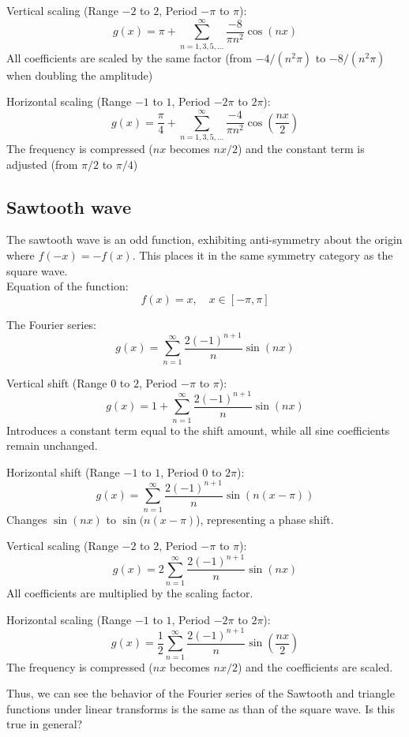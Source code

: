 \documentclass{article}
\begin{document}
Vertical scaling (Range $-2$ to $2$, Period $-\pi$ to $\pi$):
$$g(x) = \pi + \sum_{n=1,3,5,...}^{\infty}\frac{-8}{\pi n^2}\cos(nx)$$
All coefficients are scaled by the same factor (from $-4/(n^2\pi)$ to $-8/(n^2\pi)$ when doubling the amplitude)

Horizontal scaling (Range $-1$ to $1$, Period $-2\pi$ to $2\pi$):
$$g(x) = \frac{\pi}{4} +\sum_{n=1,3,5,...}^{\infty}\frac{-4}{\pi n^2}\cos\left(\frac{nx}{2}\right)$$
The frequency is compressed ($nx$ becomes $nx/2$) and the constant term is adjusted (from $\pi/2$ to $\pi/4$)

\subsection{Sawtooth wave}

The sawtooth wave is an odd function, exhibiting anti-symmetry about the origin where $f(-x) = -f(x)$. This places it in the same symmetry category as the square wave.\\

Equation of the function:
\begin{equation}
f(x) = x, \quad x \in [-\pi, \pi]
\end{equation}

The Fourier series:
$$g(x) = \sum_{n=1}^{\infty} \frac{2(-1)^{n+1}}{n} \sin(nx)$$

Vertical shift (Range $0$ to $2$, Period $-\pi$ to $\pi$):
$$g(x) = 1 + \sum_{n=1}^{\infty} \frac{2(-1)^{n+1}}{n} \sin(nx)$$
Introduces a constant term equal to the shift amount, while all sine coefficients remain unchanged.

Horizontal shift (Range $-1$ to $1$, Period $0$ to $2\pi$):
$$g(x) = \sum_{n=1}^{\infty} \frac{2(-1)^{n+1}}{n} \sin(n(x-\pi))$$
Changes $\sin(nx)$ to $\sin(n(x-\pi)$), representing a phase shift.

Vertical scaling (Range $-2$ to $2$, Period $-\pi$ to $\pi$):
$$g(x) = 2\sum_{n=1}^{\infty} \frac{2(-1)^{n+1}}{n} \sin(nx)$$
All coefficients are multiplied by the scaling factor.

Horizontal scaling (Range $-1$ to $1$, Period $-2\pi$ to $2\pi$):
$$g(x) = \frac{1}{2}\sum_{n=1}^{\infty} \frac{2(-1)^{n+1}}{n} \sin\left(\frac{nx}{2}\right)$$
The frequency is compressed ($nx$ becomes $nx/2$) and the coefficients are scaled.

Thus, we can see the behavior of the Fourier series of the Sawtooth and triangle functions under linear transforms is the same as than of the square wave. Is this true in general?
\end{document}
